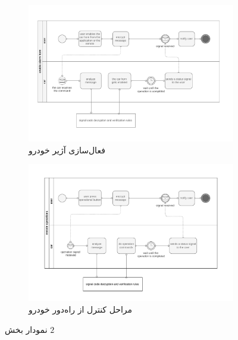 \begin{figure}[!ht]
    \centering
    \footnotesize
    \begin{subfigure}[t]{0.47\linewidth}
        \centering
        \includegraphics[width=\textwidth]{../diagrams/bpmn-diagram-1.pdf}
        \caption{
        فعال‌سازی آژیر خودرو
        }
        \label{subfig1:fig5:sec5:chap2}
    \end{subfigure}
    \begin{subfigure}[t]{0.47\linewidth}
        \centering
        \includegraphics[width=\textwidth]{../diagrams/bpmn-diagram-2.pdf}
        \caption{
            مراحل کنترل از راه‌دور  خودرو
        }
        \label{subfig2:fig5:sec5:chap2}
    \end{subfigure}
    \hspace*{1cm}
    \normalsize
    \label{fig5:sec5:chap2}
    \caption{
        نمودار
        بخش
        $2$
    }
\end{figure}

